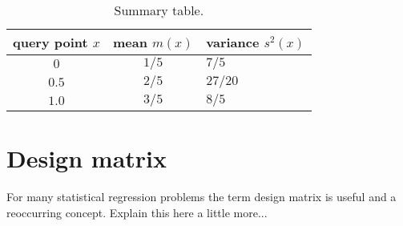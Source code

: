 \documentclass[11pt, DINA4, fleqn]{amsart}
\begin{document}

\renewcommand{\arraystretch}{1.40}

\begin{center}
	\begin{table}
	\begin{tabularx}{8.0cm}{ccX}
		\hline
		query point $x$ & mean $m(x)$ & variance $s^2(x)$\\
		\hline
		$0$ & $1/5$ & $7/5$ \\  
		$0.5$ & $2/5$ & $27/20$ \\
		$1.0$ & $3/5$ & $8/5$ \\ 
		\hline  
	\end{tabularx}
	
	 \caption{Summary table.\label{tbl:benchmarkTable}}

\end{table}
\end{center}

\section{Design matrix}
For many statistical regression problems the term design matrix is useful and a reoccurring concept. Explain this here a little more...
\end{document}
